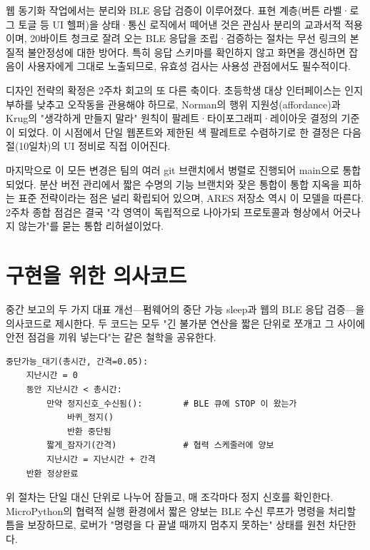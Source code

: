 웹 동기화 작업에서는  분리와 BLE 응답 검증이 이루어졌다. 표현 계층(버튼 라벨·로그 토글 등 UI 헬퍼)을 상태·통신 로직에서 떼어낸 것은 관심사 분리의 교과서적 적용이며\cite{martin2008cleancode}, 20바이트 청크로 잘려 오는 BLE 응답을 조립·검증하는 절차는 무선 링크의 본질적 불안정성에 대한 방어다\cite{webbluetooth,bluetooth54}. 특히 응답 스키마를 확인하지 않고 화면을 갱신하면 잡음이 사용자에게 그대로 노출되므로, 유효성 검사는 사용성 관점에서도 필수적이다\cite{nielsen1994heuristics}.

디자인 전략의 확정은 2주차 회고의 또 다른 축이다. 초등학생 대상 인터페이스는 인지 부하를 낮추고 오작동을 관용해야 하므로, Norman의 행위 지원성(affordance)과 Krug의 "생각하게 만들지 말라" 원칙이 팔레트·타이포그래피·레이아웃 결정의 기준이 되었다\cite{norman2013design,krug2014dontmakemethink}. 이 시점에서 단일 웹폰트와 제한된 색 팔레트로 수렴하기로 한 결정은 다음 절(10일차)의 UI 정비로 직접 이어진다.

마지막으로 이 모든 변경은 팀의 여러 git 브랜치에서 병렬로 진행되어 main으로 통합되었다. 분산 버전 관리에서 짧은 수명의 기능 브랜치와 잦은 통합이 통합 지옥을 피하는 표준 전략이라는 점은 널리 확립되어 있으며\cite{chacon2014progit}, ARES 저장소\cite{ares-repo} 역시 이 모델을 따른다. 2주차 종합 점검은 결국 "각 영역이 독립적으로 나아가되 프로토콜과 형상에서 어긋나지 않는가"를 묻는 통합 리허설이었다.

\section{구현을 위한 의사코드}

중간 보고의 두 가지 대표 개선—펌웨어의 중단 가능 sleep과 웹의 BLE 응답 검증—을 의사코드로 제시한다. 두 코드는 모두 "긴 불가분 연산을 짧은 단위로 쪼개고 그 사이에 안전 점검을 끼워 넣는다"는 같은 철학을 공유한다.

\begin{verbatim}
중단가능_대기(총시간, 간격=0.05):
    지난시간 = 0
    동안 지난시간 < 총시간:
        만약 정지신호_수신됨():        # BLE 큐에 STOP 이 왔는가
            바퀴_정지()
            반환 중단됨
        짧게_잠자기(간격)             # 협력 스케줄러에 양보
        지난시간 = 지난시간 + 간격
    반환 정상완료
\end{verbatim}

위 절차는 단일  대신  단위로 나누어 잠들고, 매 조각마다 정지 신호를 확인한다. MicroPython의 협력적 실행 환경에서 짧은 양보는 BLE 수신 루프가 명령을 처리할 틈을 보장하므로, 로버가 "명령을 다 끝낼 때까지 멈추지 못하는" 상태를 원천 차단한다.

